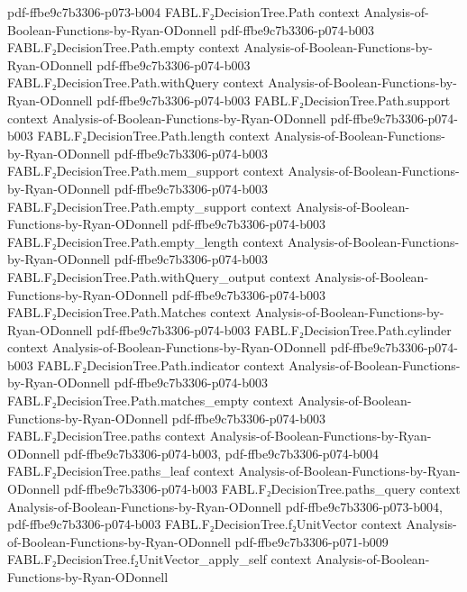 \begin{theorem}
  {pdf-ffbe9c7b3306-p073-b004}
\proofstep
  {FABL.F₂DecisionTree.Path}
  {context}
  {Analysis-of-Boolean-Functions-by-Ryan-ODonnell}
  {pdf-ffbe9c7b3306-p074-b003}
\proofstep
  {FABL.F₂DecisionTree.Path.empty}
  {context}
  {Analysis-of-Boolean-Functions-by-Ryan-ODonnell}
  {pdf-ffbe9c7b3306-p074-b003}
\proofstep
  {FABL.F₂DecisionTree.Path.withQuery}
  {context}
  {Analysis-of-Boolean-Functions-by-Ryan-ODonnell}
  {pdf-ffbe9c7b3306-p074-b003}
\proofstep
  {FABL.F₂DecisionTree.Path.support}
  {context}
  {Analysis-of-Boolean-Functions-by-Ryan-ODonnell}
  {pdf-ffbe9c7b3306-p074-b003}
\proofstep
  {FABL.F₂DecisionTree.Path.length}
  {context}
  {Analysis-of-Boolean-Functions-by-Ryan-ODonnell}
  {pdf-ffbe9c7b3306-p074-b003}
\proofstep
  {FABL.F₂DecisionTree.Path.mem_support}
  {context}
  {Analysis-of-Boolean-Functions-by-Ryan-ODonnell}
  {pdf-ffbe9c7b3306-p074-b003}
\proofstep
  {FABL.F₂DecisionTree.Path.empty_support}
  {context}
  {Analysis-of-Boolean-Functions-by-Ryan-ODonnell}
  {pdf-ffbe9c7b3306-p074-b003}
\proofstep
  {FABL.F₂DecisionTree.Path.empty_length}
  {context}
  {Analysis-of-Boolean-Functions-by-Ryan-ODonnell}
  {pdf-ffbe9c7b3306-p074-b003}
\proofstep
  {FABL.F₂DecisionTree.Path.withQuery_output}
  {context}
  {Analysis-of-Boolean-Functions-by-Ryan-ODonnell}
  {pdf-ffbe9c7b3306-p074-b003}
\proofstep
  {FABL.F₂DecisionTree.Path.Matches}
  {context}
  {Analysis-of-Boolean-Functions-by-Ryan-ODonnell}
  {pdf-ffbe9c7b3306-p074-b003}
\proofstep
  {FABL.F₂DecisionTree.Path.cylinder}
  {context}
  {Analysis-of-Boolean-Functions-by-Ryan-ODonnell}
  {pdf-ffbe9c7b3306-p074-b003}
\proofstep
  {FABL.F₂DecisionTree.Path.indicator}
  {context}
  {Analysis-of-Boolean-Functions-by-Ryan-ODonnell}
  {pdf-ffbe9c7b3306-p074-b003}
\proofstep
  {FABL.F₂DecisionTree.Path.matches_empty}
  {context}
  {Analysis-of-Boolean-Functions-by-Ryan-ODonnell}
  {pdf-ffbe9c7b3306-p074-b003}
\proofstep
  {FABL.F₂DecisionTree.paths}
  {context}
  {Analysis-of-Boolean-Functions-by-Ryan-ODonnell}
  {pdf-ffbe9c7b3306-p074-b003,
    pdf-ffbe9c7b3306-p074-b004}
\proofstep
  {FABL.F₂DecisionTree.paths_leaf}
  {context}
  {Analysis-of-Boolean-Functions-by-Ryan-ODonnell}
  {pdf-ffbe9c7b3306-p074-b003}
\proofstep
  {FABL.F₂DecisionTree.paths_query}
  {context}
  {Analysis-of-Boolean-Functions-by-Ryan-ODonnell}
  {pdf-ffbe9c7b3306-p073-b004,
    pdf-ffbe9c7b3306-p074-b003}
\proofstep
  {FABL.F₂DecisionTree.f₂UnitVector}
  {context}
  {Analysis-of-Boolean-Functions-by-Ryan-ODonnell}
  {pdf-ffbe9c7b3306-p071-b009}
\proofstep
  {FABL.F₂DecisionTree.f₂UnitVector_apply_self}
  {context}
  {Analysis-of-Boolean-Functions-by-Ryan-ODonnell}

\end{theorem}
